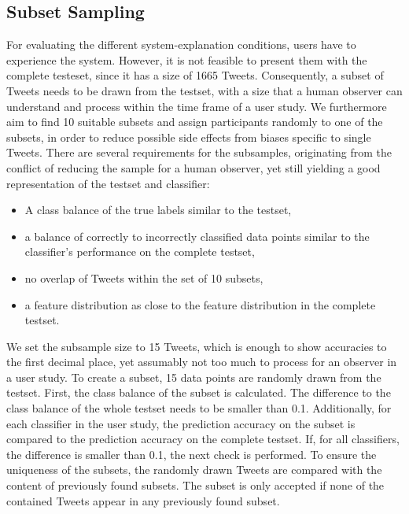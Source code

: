 \subsection{Subset Sampling}
For evaluating the different system-explanation conditions, users have to experience the system. However, it is not feasible to present them with the complete testeset, since it has a size of 1665 Tweets. Consequently, a subset of Tweets needs to be drawn from the testset, with a size that a human observer can understand and process within the time frame of a user study.\newline
We furthermore aim to find 10 suitable subsets and assign participants randomly to one of the subsets, in order to reduce possible side effects from biases specific to single Tweets.\newline
There are several requirements for the subsamples, originating from the conflict of reducing the sample for a human observer, yet still yielding a good representation of the testset and classifier:\newline
\begin{itemize}
	\item A class balance of the true labels similar to the testset, 
	\item a balance of correctly to incorrectly classified data points similar to the classifier's performance on the complete testset, 
	\item no overlap of Tweets within the set of 10 subsets,
	\item a feature distribution as close to the feature distribution in the complete testset.
\end{itemize}
We set the subsample size to 15 Tweets, which is enough to show accuracies to the first decimal place, yet assumably not too much to process for an observer in a user study.\newline
To create a subset, 15 data points are randomly drawn from the testset. \newline
First, the class balance of the subset is calculated. The difference to the class balance of the whole testset needs to be smaller than 0.1.\newline
Additionally, for each classifier in the user study, the prediction accuracy on the subset is compared to the prediction accuracy on the complete testset. If, for all classifiers, the difference is smaller than 0.1, the next check is performed.\newline
To ensure the uniqueness of the subsets, the randomly drawn Tweets are compared with the content of previously found subsets. The subset is only accepted if none of the contained Tweets appear in any previously found subset.\newline
